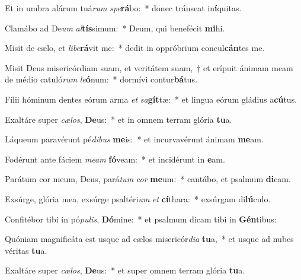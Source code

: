 \item Et in umbra alárum tuá\textit{rum} \textit{spe}\textbf{rá}bo:~* donec tránseat in\textbf{í}quitas.
\item Clamábo ad De\textit{um} \textit{al}\textbf{tís}simum:~* Deum, qui benefécit \textbf{mi}hi.
\item Misit de cælo, et \textit{li}\textit{be}\textbf{rá}vit me:~* dedit in oppróbrium concul\textbf{cán}tes me.
\item Misit Deus misericórdiam suam, et veritátem suam,~† et erípuit ánimam meam de médio catuló\textit{rum} \textit{le}\textbf{ó}num:~* dormívi contur\textbf{bá}tus.
\item Fílii hóminum dentes eórum arma \textit{et} \textit{sa}\textbf{gít}tæ:~* et lingua eórum gládius a\textbf{cú}tus.
\item Exaltáre super \textit{cæ}\textit{los}, \textbf{De}us:~* et in omnem terram glória \textbf{tu}a.
\item Láqueum paravérunt pé\textit{di}\textit{bus} \textbf{me}is:~* et incurvavérunt ánimam \textbf{me}am.
\item Fodérunt ante fáciem \textit{me}\textit{am} \textbf{fó}veam:~* et incidérunt in \textbf{e}am.
\item Parátum cor meum, Deus, pará\textit{tum} \textit{cor} \textbf{me}um:~* cantábo, et psalmum \textbf{di}cam.
\item Exsúrge, glória mea, exsúrge psaltéri\textit{um} \textit{et} \textbf{cí}thara:~* exsúrgam di\textbf{lú}culo.
\item Confitébor tibi in pó\textit{pu}\textit{lis}, \textbf{Dó}mine:~* et psalmum dicam tibi in \textbf{Gén}tibus:
\item Quóniam magnificáta est usque ad cælos misericór\textit{di}\textit{a} \textbf{tu}a,~* et usque ad nubes véritas \textbf{tu}a.
\item Exaltáre super \textit{cæ}\textit{los}, \textbf{De}us:~* et super omnem terram glória \textbf{tu}a.
